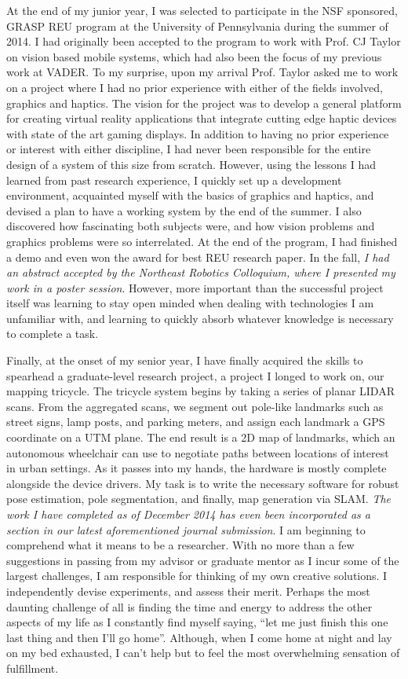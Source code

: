 \documentclass[12pt]{article}
\begin{document}
At the end of my junior year, I was selected to participate in the NSF
sponsored, GRASP REU program at the University of Pennsylvania during the
summer of 2014. I had originally been accepted to the program to work with
Prof. CJ Taylor on vision based mobile systems, which had also been the focus
of my previous work at VADER. To my surprise, upon my arrival Prof. Taylor
asked me to work on a project where I had no prior experience with either of
the fields involved, graphics and haptics. The vision for the project was to
develop a general platform for creating virtual reality applications that
integrate cutting edge haptic devices with state of the art gaming displays.
In addition to having no prior experience or interest with either discipline, I
had never been responsible for the entire design of a system of this size from
scratch.  However, using the lessons I had learned from past research
experience, I quickly set up a development environment, acquainted myself with
the basics of graphics and haptics, and devised a plan to have a working system
by the end of the summer. I also discovered how fascinating both subjects were,
and how vision problems and graphics problems were so interrelated. At the end
of the program, I had finished a demo and even won the award for best REU
research paper. In the fall, \emph{I had an abstract accepted by the Northeast
Robotics Colloquium, where I presented my work in a poster session}.  However,
more important than the successful project itself was learning to stay open
minded when dealing with technologies I am unfamiliar with, and learning to
quickly absorb whatever knowledge is necessary to complete a task.

Finally, at the onset of my senior year, I have finally acquired the skills to
spearhead a graduate-level research project, a project I longed to work on, our
mapping tricycle. The tricycle system begins by taking a series of planar LIDAR
scans. From the aggregated scans, we segment out pole-like landmarks such as
street signs, lamp posts, and parking meters, and assign each landmark a GPS
coordinate on a UTM plane.  The end result is a 2D map of landmarks, which an
autonomous wheelchair can use to negotiate paths between locations of interest
in urban settings. As it passes into my hands, the hardware is mostly complete
alongside the device drivers. My task is to write the necessary software for
robust pose estimation, pole segmentation, and finally, map generation via
SLAM. \emph{The work I have completed as of December 2014 has even been
incorporated as a section in our latest aforementioned journal submission}. I
am beginning to comprehend what it means to be a researcher. With no more than
a few suggestions in passing from my advisor or graduate mentor as I incur some
of the largest challenges, I am responsible for thinking of my own creative
solutions. I independently devise experiments, and assess their merit.  Perhaps
the most daunting challenge of all is finding the time  and energy to address
the other aspects of my life as I constantly find myself saying, ``let me just
finish this one last thing and then I'll go home''. Although, when I come home
at night and lay on my bed exhausted, I can't help but to feel the most
overwhelming sensation of fulfillment.
\end{document}
